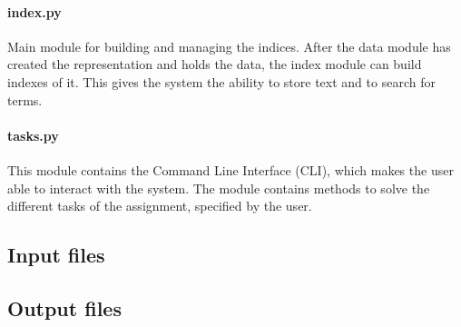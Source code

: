 \paragraph{index.py}
Main module for building and managing the indices. After the data module has created the representation and holds the data, the index module can build indexes of it. This gives the system the ability to store text and to search for terms.

\paragraph{tasks.py}
This module contains the Command Line Interface (CLI), which makes the user able to interact with the system. The module contains methods to solve the different tasks of the assignment, specified by the user. 


\subsection{Input files}
\label{inputfiles}

\subsection{Output files}


